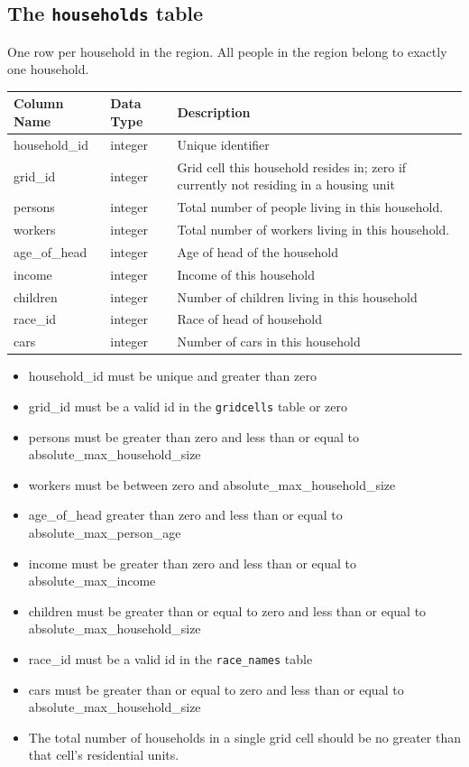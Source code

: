 \subsection{The {\tt households} table}
\label{sec:household-tables-households}

One row per household in the region. All people in the region belong to exactly
one household.


\begin{tabular}{|l|l|l|}
\hline
\textbf{Column Name} & \textbf{Data Type} & \textbf{Description} \\
\hline
household_id & integer & Unique identifier  \\
\hline
grid_id & integer & Grid cell this household resides in; zero if currently not residing in a housing unit  \\
\hline
persons & integer & Total number of people living in this household.  \\
\hline
workers & integer & Total number of workers living in this household.  \\
\hline
age_of_head & integer & Age of head of the household  \\
\hline
income & integer & Income of this household  \\
\hline
children & integer & Number of children living in this household  \\
\hline
race_id & integer & Race of head of household  \\
\hline
cars & integer & Number of cars in this household  \\
\hline

\end{tabular}

\begin{itemize} \tight
\item household_id must be unique and greater than zero
\item grid_id must be a valid id in the \verb|gridcells| table or zero
\item persons must be greater than zero and less than or equal to
absolute_max_household_size
\item workers must be between zero and absolute_max_household_size
\item age_of_head greater than zero and less than or equal to
absolute_max_person_age
\item income must be greater than zero and less than or equal to
absolute_max_income
\item children must be greater than or equal to zero and less than or equal to
absolute_max_household_size
\item race_id must be a valid id in the \verb|race_names| table
\item cars must be greater than or equal to zero and less than or equal to
absolute_max_household_size
\item The total number of households in a single grid cell should be no greater
than that cell's residential units.

\end{itemize}

